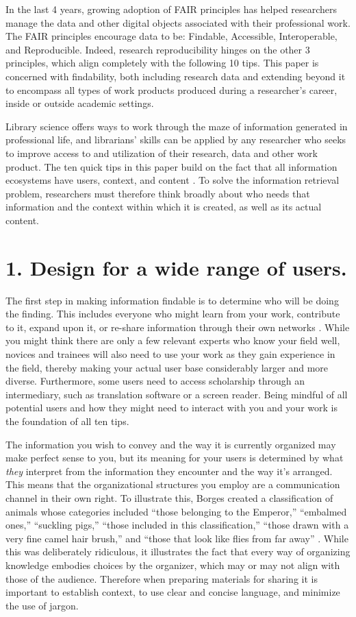 \documentclass[10pt,letterpaper]{article}
\newcommand{\rulemajor}[1]{\section*{#1}}
\begin{document}
In the last 4 years, growing adoption of FAIR principles \cite{Wilkinson2016} has helped
researchers manage the data and other digital objects associated with their professional
work. The FAIR principles encourage data to be: Findable, Accessible,
Interoperable, and Reproducible. Indeed, research reproducibility hinges
on the other 3 principles, which align completely with the following 10 tips. 
This paper is concerned with findability, both including research data and extending beyond
it to encompass all types of work products produced during a researcher's career, 
inside or outside academic settings.

Library science offers ways to work through the maze of information generated in
professional life, and librarians' skills can be applied by any researcher who
seeks to improve access to and utilization of their research, data and other work product. The ten quick tips in this paper build on the fact that all
information ecosystems have users, context, and content \cite{Rosenfeld2015}.
To solve the information retrieval problem, researchers must therefore think
broadly about who needs that information and the context within which it is
created, as well as its actual content.

\rulemajor{1. Design for a wide range of users.}

The first step in making information findable is to determine who will be doing
the finding. This includes everyone who might learn from your work, contribute to it,
expand upon it, or re-share information through their own networks \cite{Covert2014}.
While you might think there are only a few relevant experts who know your field well, 
novices and trainees will also need to use your work as they gain experience in the field,
thereby making your actual user base considerably larger and more diverse. Furthermore,
some users need to access scholarship through an intermediary, such as translation
software or a screen reader. Being mindful of all potential users and how they
might need to interact with you and your work is the foundation of all ten tips.

The information you wish to convey and the way it is currently organized may
make perfect sense to you, but its meaning for your users is determined by what
\emph{they} interpret from the information they encounter and the way it's
arranged. This means that the organizational structures you employ are a
communication channel in their own right. To illustrate this, Borges created a
classification of animals whose categories included ``those belonging to the
Emperor,'' ``embalmed ones,'' ``suckling pigs,'' ``those included in this
classification,'' ``those drawn with a very fine camel hair brush,'' and ``those
that look like flies from far away'' \cite{Borges2000}. While this was
deliberately ridiculous, it illustrates the fact that every way of organizing
knowledge embodies choices by the organizer, which may or may not align with
those of the audience. Therefore when preparing materials for sharing it is important
to establish context, to use clear and concise language, and minimize the use of jargon.
\end{document}
